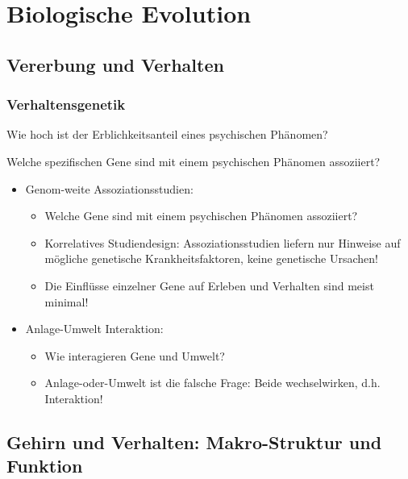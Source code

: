\section{Biologische Evolution}
\subsection{Vererbung und Verhalten}
\subsubsection{Verhaltensgenetik}
Wie hoch ist der Erblichkeitsanteil eines psychischen Phänomen?

Welche spezifischen Gene sind mit einem psychischen Phänomen assoziiert?

\begin{itemize}
	\item Genom-weite Assoziationsstudien: 
		\begin{itemize}
			\item Welche Gene sind mit einem psychischen Phänomen assoziiert?
			\item Korrelatives Studiendesign: Assoziationsstudien liefern nur Hinweise auf mögliche genetische Krankheitsfaktoren, keine genetische Ursachen!
			\item Die Einflüsse einzelner Gene auf Erleben und Verhalten sind meist minimal!
		\end{itemize}
	\item Anlage-Umwelt Interaktion:
		\begin{itemize}
			\item Wie interagieren Gene und Umwelt?
			\item Anlage-oder-Umwelt ist die falsche Frage: Beide
					wechselwirken, d.h. Interaktion!
		\end{itemize}
\end{itemize}
\subsection{Gehirn und Verhalten: Makro-Struktur und Funktion}
